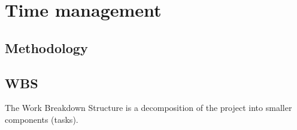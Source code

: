 \section{Time management}



\subsection{Methodology}






\subsection{WBS}
The Work Breakdown Structure is a decomposition of the project into smaller components (tasks).

